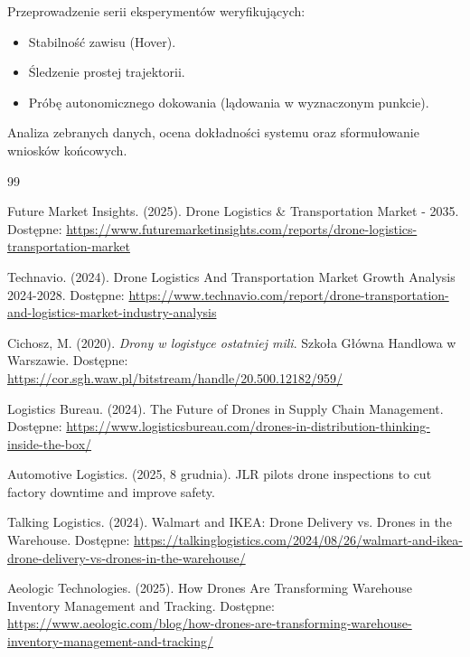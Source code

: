 \documentclass{EE-dyplom}
\begin{document}
\begin{itemize}
\begin{description}[style=nextline]
    \item[Etap 4: Testy w locie.]
    Przeprowadzenie serii eksperymentów weryfikujących:
    \begin{itemize}
        \item Stabilność zawisu (Hover).
        \item Śledzenie prostej trajektorii.
        \item Próbę autonomicznego dokowania (lądowania w wyznaczonym punkcie).
    \end{itemize}
    
    \item[Etap 5:  Analiza danych.]
    Analiza zebranych danych, ocena dokładności systemu oraz sformułowanie wniosków końcowych.
\end{description}


\newpage
\begin{thebibliography}{99}

Future Market Insights. (2025). Drone Logistics \& Transportation Market - 2035. Dostępne: \url{https://www.futuremarketinsights.com/reports/drone-logistics-transportation-market}

Technavio. (2024). Drone Logistics And Transportation Market Growth Analysis 2024-2028. Dostępne: \url{https://www.technavio.com/report/drone-transportation-and-logistics-market-industry-analysis}

Cichosz, M. (2020). \textit{Drony w logistyce ostatniej mili}. Szkoła Główna Handlowa w Warszawie. Dostępne: \url{https://cor.sgh.waw.pl/bitstream/handle/20.500.12182/959/}

Logistics Bureau. (2024). The Future of Drones in Supply Chain Management. Dostępne: \url{https://www.logisticsbureau.com/drones-in-distribution-thinking-inside-the-box/}

Automotive Logistics. (2025, 8 grudnia). JLR pilots drone inspections to cut factory downtime and improve safety.

Talking Logistics. (2024). Walmart and IKEA: Drone Delivery vs. Drones in the Warehouse. Dostępne: \url{https://talkinglogistics.com/2024/08/26/walmart-and-ikea-drone-delivery-vs-drones-in-the-warehouse/}

Aeologic Technologies. (2025). How Drones Are Transforming Warehouse Inventory Management and Tracking. Dostępne: \url{https://www.aeologic.com/blog/how-drones-are-transforming-warehouse-inventory-management-and-tracking/}


\end{thebibliography}
\end{itemize}
\end{document}
